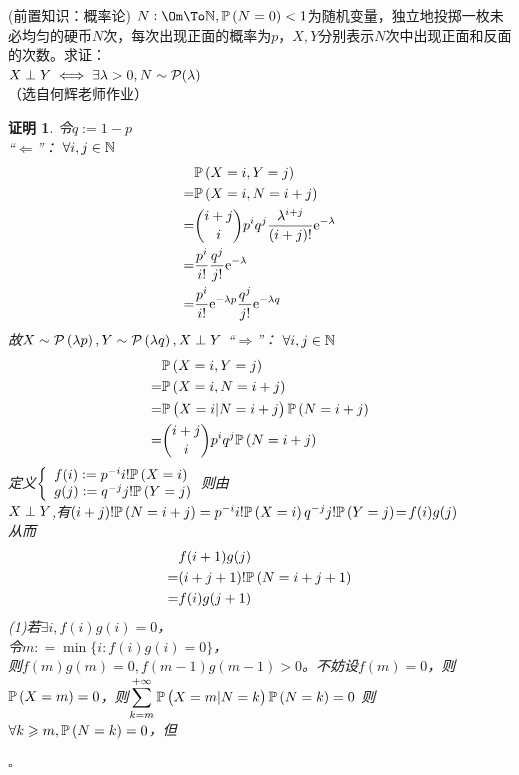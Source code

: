 \documentclass[UTF8, a4paper, 12pt, oneside, twocolumn]{article}
\numberwithin{equation}{section}
\numberwithin{figure}{section}
\numberwithin{table}{section}
\def\dmin{\displaystyle\min}
\def\dsum{\displaystyle\sum}	%
\def\geq{\geqslant}	%
\newtheorem*{Proof}{证明}
\newif\ifproof
\newenvironment{Ex}[1][]{\prooffalse \begin{EExercise}{#1}{}}%
{\ifproof%
\hfill\ensuremath{\square}\end{Proof}%
\fi%
\end{EExercise}}
\newcommand{\pr}{\tcblower \begin{Proof}\prooftrue }
\begin{document}
\begin{Ex}[(前置知识：概率论)]
$N:\Om\To\N,\Pb[N=0]<1$为随机变量，独立地投掷一枚未必均匀的硬币$N$次，每次出现正面的概率为$p$，$X,Y$分别表示$N$次中出现正面和反面的次数。求证：\\$X\perp Y\iff \exists \lambda>0 ,N\sim \mathcal{P}(\lambda)$\\
（选自何辉老师作业）
\pr
令$q:=1-p$\\
“$\Leftarrow$”：
$\forall i,j\in \mathbb{N}$
\vspace{-15pt}\begin{align*}
&\Pb[X=i,Y=j]\\
=&\Pb[X=i,N=i+j]\\
=&\Cb{i+j}{i}p^iq^{j}\frac{\lambda ^{i+j}}{(i+j)!}\exp{-\lambda}\\
=&\frac{p^i}{i!}\frac{q^j}{j!}\exp{-\lambda}\\
=&\frac{p^i}{i!}\exp{-\lambda p}\frac{q^j}{j!}\exp{-\lambda  q }
\vspace{-15pt}\end{align*}
故$X\sim \mathcal{P}\left(\lambda p\right),Y\sim \mathcal{P}\left(\lambda  q \right),X\perp Y$
“$\Rightarrow$”：
$\forall i,j\in \mathbb{N}$
\vspace{-15pt}\begin{align*}
&\Pb[X=i,Y=j]\\
=&\Pb[X=i,N=i+j]\\
=&\Pbb{X=i}{N=i+j}\Pb[N=i+j]\\
=&\Cb{i+j}{i}p^iq^{j}\Pb[N=i+j]
\vspace{-15pt}\end{align*}
定义$\left\{\begin{array}{l}f(i):=p^{-i}i!\Pb[X=i]\\
g(j):=q^{-j}j!\Pb[Y=j]\end{array}\right.$则由\\$X\perp Y$,有$(i+j)!\Pb[N=i+j]=p^{-i}i!\Pb[X=i]q^{-j}j!\Pb[Y=j]\!=\!f(i)g(j)$\\
从而
\vspace{-15pt}\begin{align*}
&f(i+1)g(j)\\
=&(i+j+1)!\Pb[N=i+j+1]\\
=&f(i)g(j+1)
\vspace{-15pt}\end{align*}
(1)若$\exists i,f(i)g(i)=0$，\\
令$m\colon=\dmin\{i\colon f(i)g(i)=0\}$，\\
则$f(m)g(m)=0,f(m-1)g(m-1)>0$。不妨设$f(m)=0$，则$\Pb[X=m]=0$，则$\dsum_{k=m}^{+\infty}\Pbb{X=m}{N=k}\Pb[N=k]=0$
则$\forall k\geq m,\Pb[N=k]=0$，但

\end{Ex}
\end{document}
